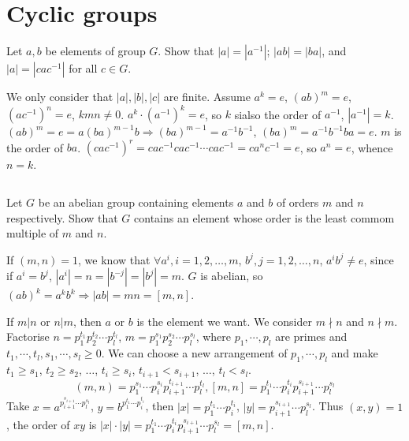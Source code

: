 \section{Cyclic groups}
\begin{ex}
    Let $a,b$ be elements of group $G$. Show that $\left| a \right| =\left| a^{-1} \right| $; $\left| ab \right| =\left| ba \right| $, and $\left| a \right| =\left| cac^{-1} \right| $ for all $c\in G$.
\end{ex}

\begin{answer}
    We only consider that $\left| a \right| , \left| b \right| , \left| c \right| $ are finite. Assume $a^{k}=e$, $(ab)^{m}=e$, $(ac^{-1})^{n}=e$, $kmn\neq 0$. $a^{k}\cdot(a^{-1})^{k}=e$, so $k$ sialso the order of $a^{-1}$, $\left| a^{-1} \right| =k$. $(ab)^{m}=e=a(ba)^{m-1}b\Rightarrow (ba)^{m-1}=a^{-1}b^{-1}$, $(ba)^{m}=a^{-1}b^{-1}ba=e$. $m$ is the order of $ba$. $(cac^{-1})^{r}=cac^{-1}cac^{-1}\cdots cac^{-1}=ca^{n}c^{-1}=e$, so $a^{n}=e$, whence $n=k$.
\end{answer}

$$ $$

\begin{ex}
    Let $G$ be an abelian group containing elements $a$ and $b$ of orders $m$ and $n$ respectively. Show that $G$ contains an element whose order is the least commom multiple of $m$ and $n$.
\end{ex}

\begin{answer}
    If $(m,n)=1$, we know that $\forall a^{i}, i=1,2,\dots, m$, $b^{j}, j=1, 2, \dots, n$, $a^{i}b^{j}\neq e$, since if $a^{i}=b^{j}$, $\left| a^{i} \right| =n=\left| b^{-j} \right| =\left| b^{j} \right| =m$. $G$ is abelian, so $(ab)^{k}=a^{k}b^{k}\Rightarrow \left| ab \right|=mn=\left[ m,n\right]$.

    If $m|n$ or $n|m$, then $a$ or $b$ is the element we want. We consider $m\nmid n$ and $n\nmid m$. Factorise $n=p_{1}^{t_{1}}p_{2}^{t_{2}}\cdots p_{l}^{t_{l}}$, $m=p_{1}^{s_{1}}p_{2}^{s_{2}}\cdots p_{l}^{s_{l}}$, where $p_{1},\cdots,p_{l}$ are primes and $t_{1},\cdots,t_{l}, s_{1},\cdots, s_{l}\geq 0$. We can choose a new arrangement of $p_{1},\cdots,p_{l}$ and make $t_{1}\geq s_{1}$, $t_{2}\geq s_{2}$, $\dots$, $t_{i}\geq s_{i}$, $t_{i+1}<s_{i+1}$, $\dots$, $t_{l}<s_{l}$.\[(m,n)=p_{1}^{s_{1}}\cdots p_{i}^{s_{i}}p_{i+1}^{t_{i+1}}\cdots p_{l}^{t_{l}}, \left[m,n\right]=p_{1}^{t_{1}}\cdots p_{i}^{t_{i}}p_{i+1}^{s_{i+1}}\cdots p_{l}^{s_{l}}\] Take $x=a^{{p_{i+1}^{s_{i+1}}}\cdots p_{l}^{s_{l}}}$, $y=b^{{p_{1}^{t_{1}}}\cdots p_{i}^{t_{i}}}$, then $\left| x \right| ={p_{1}^{t_{1}}}\cdots p_{i}^{t_{i}}$, $\left| y \right| =p_{i+1}^{s_{i+1}}\cdots p_{l}^{s_{l}}$. Thus $(x,y)=1$, the order of $xy$ is $\left| x \right| \cdot\left| y \right| =p_{1}^{t_{1}}\cdots p_{i}^{t_{i}}p_{i+1}^{s_{i+1}}\cdots p_{l}^{s_{l}}=\left[m,n\right]$.
\end{answer}

